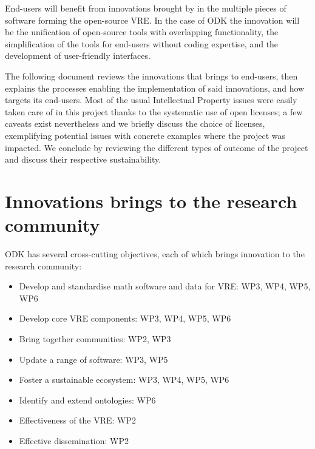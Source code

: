\documentclass{deliverablereport}
\begin{document}
End-users will benefit from innovations brought by \ODK in the
multiple pieces of software forming the open-source VRE. In the case of
ODK the innovation will be the unification of open-source
tools with overlapping functionality, the simplification of the tools
for end-users without coding expertise, and the development of
user-friendly interfaces.

The following document reviews the innovations that \ODK brings to
end-users, then explains the processes enabling the implementation of
said innovations, and how \ODK targets its end-users. Most of the usual
Intellectual Property issues were easily taken care of in this project
thanks to the systematic use of open licenses; a few caveats exist
nevertheless and we briefly discuss the choice of licenses,
exemplifying potential issues with concrete examples where the project
was impacted. We conclude by reviewing the different types of outcome
of the project and discuss their respective sustainability.

\section{Innovations \ODK brings to the research community}

ODK has several cross-cutting objectives, each of which
brings innovation to the research community:
\begin{itemize}
\item{Develop and standardise math software and data for VRE: WP3, WP4, WP5, WP6}
\item{Develop core VRE components: WP3, WP4, WP5, WP6}
\item{Bring together communities: WP2, WP3}
\item{Update a range of software: WP3, WP5}
\item{Foster a sustainable ecosystem: WP3, WP4, WP5, WP6}
\item{Identify and extend ontologies: WP6}
\item{Effectiveness of the VRE: WP2}
\item{Effective dissemination: WP2}
\end{itemize}
\clearpage
\end{document}
